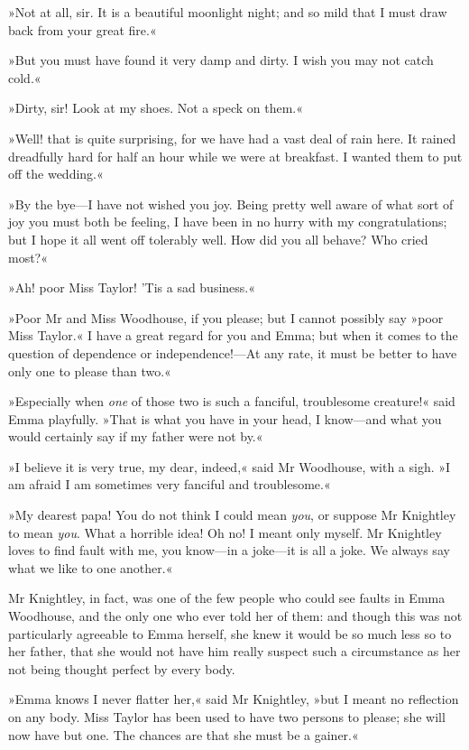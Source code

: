 »Not at all, sir. It is a beautiful moonlight night; and so mild that I must draw back from your great fire.«

»But you must have found it very damp and dirty. I wish you may not catch cold.«

»Dirty, sir! Look at my shoes. Not a speck on them.«

»Well! that is quite surprising, for we have had a vast deal of rain here. It rained dreadfully hard for half an hour while we were at breakfast. I wanted them to put off the wedding.«

»By the bye—I have not wished you joy. Being pretty well aware of what sort of joy you must both be feeling, I have been in no hurry with my congratulations; but I hope it all went off tolerably well. How did you all behave? Who cried most?«

»Ah! poor Miss Taylor! 'Tis a sad business.«

»Poor Mr and Miss Woodhouse, if you please; but I cannot possibly say »poor Miss Taylor.« I have a great regard for you and Emma; but when it comes to the question of dependence or independence!—At any rate, it must be better to have only one to please than two.«

»Especially when \textit{one} of those two is such a fanciful, troublesome creature!« said Emma playfully. »That is what you have in your head, I know—and what you would certainly say if my father were not by.«

»I believe it is very true, my dear, indeed,« said Mr Woodhouse, with a sigh. »I am afraid I am sometimes very fanciful and troublesome.«

»My dearest papa! You do not think I could mean \textit{you}, or suppose Mr Knightley to mean \textit{you}. What a horrible idea! Oh no! I meant only myself. Mr Knightley loves to find fault with me, you know—in a joke—it is all a joke. We always say what we like to one another.«

Mr Knightley, in fact, was one of the few people who could see faults in Emma Woodhouse, and the only one who ever told her of them: and though this was not particularly agreeable to Emma herself, she knew it would be so much less so to her father, that she would not have him really suspect such a circumstance as her not being thought perfect by every body.

»Emma knows I never flatter her,« said Mr Knightley, »but I meant no reflection on any body. Miss Taylor has been used to have two persons to please; she will now have but one. The chances are that she must be a gainer.«

